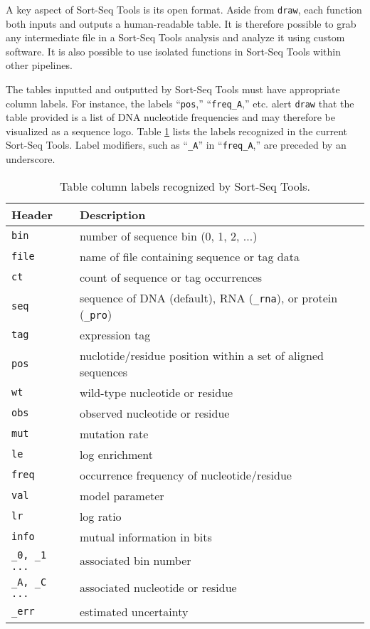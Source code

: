 \documentclass{bmcart}
\begin{document}
A key aspect of Sort-Seq Tools is its open format. Aside from \texttt{draw}, each function both inputs and outputs a human-readable table. It is therefore possible to grab any intermediate file in a Sort-Seq Tools analysis and analyze it using custom software. It is also possible to use isolated functions in Sort-Seq Tools within other pipelines. 

The tables inputted and outputted by Sort-Seq Tools must have appropriate column labels. For instance, the labels ``\texttt{pos},'' ``\texttt{freq\_A},'' etc. alert \texttt{draw} that the table provided is a list of DNA nucleotide frequencies and may therefore be visualized as a sequence logo. Table \ref{table:columns} lists the labels recognized in the current Sort-Seq Tools. Label modifiers, such as ``\texttt{\_A}'' in ``\texttt{freq\_A},'' are preceded by an underscore.

\begin{table}[h!]
\caption{Table column labels recognized by Sort-Seq Tools.}
\begin{tabular}{l|l}
Header &  Description \\ \hline \hline
\texttt{bin}            & number of sequence bin (0, 1, 2, ...) \\
\texttt{file}           & name of file containing sequence or tag data \\
\texttt{ct}             & count of sequence or tag occurrences  \\
\texttt{seq}            & sequence of DNA  (default), RNA (\texttt{\_rna}), or protein (\texttt{\_pro}) \\
\texttt{tag}            & expression tag \\
\texttt{pos}            & nuclotide/residue position within a set of aligned sequences \\
\texttt{wt}             & wild-type nucleotide or residue \\
\texttt{obs}            & observed nucleotide or residue \\ 
\texttt{mut}            & mutation rate \\
\texttt{le}             & log enrichment \\
\texttt{freq}           & occurrence frequency of nucleotide/residue \\
\texttt{val}            & model parameter  \\
\texttt{lr}             & log ratio \\
\texttt{info}           & mutual information in bits \\ 
\texttt{\_0, \_1 ...}  & associated bin number \\
\texttt{\_A, \_C ...} & associated nucleotide or residue \\
\texttt{\_err}          & estimated uncertainty 
\end{tabular}
\label{table:columns}
\end{table}
\end{document}
